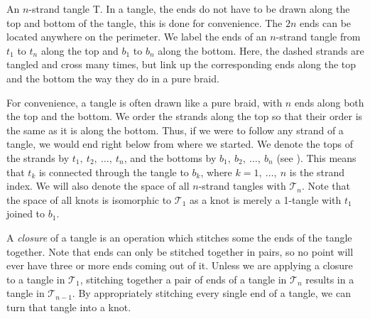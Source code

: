 \begin{paper}
{An $n$-strand tangle T.
In a tangle, the ends do not have to be drawn along the top and bottom of the
tangle, this is done for convenience.
The $2n$ ends can be located anywhere on the perimeter.
We label the ends of an $n$-strand tangle from $t_1$ to $t_n$ along the top and
$b_1$ to $b_n$ along the bottom.
Here, the dashed strands are tangled and cross many times, but link up the
corresponding ends along the top and the bottom the way they do in a pure
braid.}

For convenience, a tangle is often drawn like a pure braid, with $n$ ends along
both the top and the bottom.
We order the strands along the top so that their order is the same as it is
along the bottom.
Thus, if we were to follow any strand of a tangle, we would end right below
from where we started.
We denote the tops of the strands by $t_1,~t_2,~\dots,~t_n$, and the
bottoms  by $b_1,~b_2,~\dots,~b_n$ (see \figTangle).
This means that $t_k$ is connected through the tangle to $b_k$, where
$k=1,~\dots,~n$ is the strand index.
We will also denote the space of all $n$-strand tangles with $\mathcal{T}_n$.
Note that the space of all knots is isomorphic to $\mathcal{T}_1$ as a knot is
merely a 1-tangle with $t_1$ joined to $b_1$.

A \textit{closure} of a tangle is an operation which stitches some the ends of
the tangle together.
Note that ends can only be stitched together in pairs, so no point will ever
have three or more ends coming out of it.
Unless we are applying a closure to a tangle in $\mathcal{T}_1$, stitching
together a pair of ends of a tangle in $\mathcal{T}_n$ results in a tangle in
$\mathcal{T}_{n-1}$.
By appropriately stitching every single end of a tangle, we can turn that tangle
into a knot.


\end{paper}
